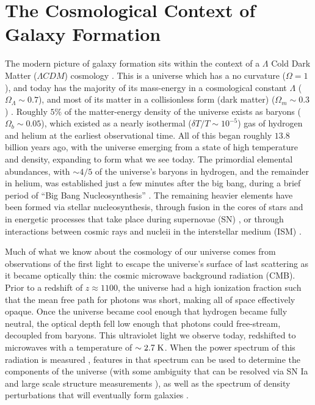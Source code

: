 \section{The Cosmological Context of Galaxy Formation}
The modern picture of galaxy formation sits within the context of a $\Lambda$ 
Cold Dark Matter  ($\Lambda CDM$) cosmology
\citep{Rees1977,White1978,Blumenthal1984,Mo1998}.  This is a universe which has
a no curvature ($\Omega = 1$), and today has the majority of its mass-energy in
a cosmological constant $\Lambda$ ($\Omega_\Lambda \sim 0.7$), and most of its
matter in a collisionless form (dark matter) ($\Omega_m \sim 0.3$)
\citep{Planck2014}.  Roughly $5\%$ of the matter-energy density of the universe
exists as baryons ($\Omega_b \sim 0.05$), which existed as a nearly isothermal
($\delta T/T\sim10^{-5}$) gas of hydrogen and helium at the earliest
observational time.  All of this began roughly $13.8$ billion years ago, with
the universe emerging from a state of high temperature and density,
expanding to form what we see today.  The primordial elemental abundances, with
$\sim4/5$ of the universe's baryons in hydrogen, and the remainder in helium,
was established just a few minutes after the big bang, during a brief period of
``Big Bang Nucleosynthesis'' \citep{Alpher1948}.  The remaining heavier elements
have been formed via stellar nucleosynthesis, through fusion in the cores of
stars and in energetic processes that take place during supernovae (SN)
\citep{Wagoner1967}, or through interactions between cosmic rays and nucleii in
the interstellar medium (ISM) \citep{Reeves1970}.

Much of what we know about the cosmology of our universe comes from
observations of the first light to escape the universe's surface of last
scattering as it became optically thin: the cosmic microwave background
radiation (CMB).  Prior to a redshift of $z\approx1100$, the universe had a
high ionization fraction such that the mean free path for photons was short,
making all of space effectively opaque.  Once the universe became cool enough
that hydrogen became fully neutral, the optical depth fell low enough that
photons could free-stream, decoupled from baryons.  This ultraviolet light we
observe today, redshifted to microwaves with a temperature of
$\sim2.7\;\rm{K}$.  When the power spectrum of this radiation is measured
\citep{Spergel2003}, features in that spectrum can be used to determine the
components of the universe (with some ambiguity that can be resolved via SN Ia
and large scale structure measurements
\citealt{Riess1998,Perlmutter1999,Beutler2011,Blake2011}), as well as the
spectrum of density perturbations that will eventually form galaxies
\citep{Press1974,Peebles1980}.

